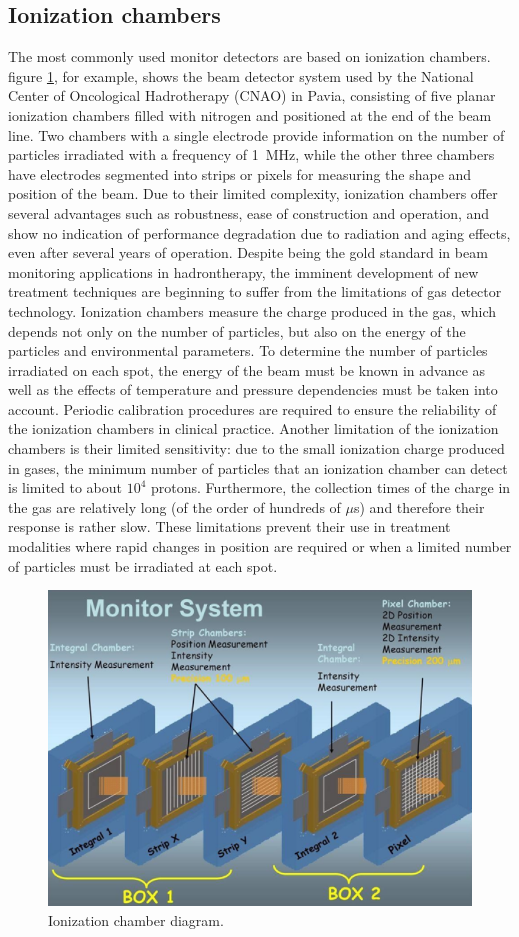 \subsection{Ionization chambers}
The most commonly used monitor detectors are based on ionization chambers.
figure \ref{fig:monitor}, for example, shows the beam detector system used by the National Center of Oncological Hadrotherapy (CNAO) in Pavia, consisting of five planar ionization chambers filled with nitrogen and positioned at the end of the beam line.
Two chambers with a single electrode provide information on the number of particles irradiated with a frequency of 1~MHz, while the other three chambers have electrodes segmented into strips or pixels for measuring the shape and position of the beam.
\newline
\noindent Due to their limited complexity, ionization chambers offer several advantages such as robustness, ease of construction and operation, and show no indication of performance degradation due to radiation and aging effects, even after several years of operation.
Despite being the gold standard in beam monitoring applications in hadrontherapy, the imminent development of new treatment techniques are beginning to suffer from the limitations of gas detector technology.
\newline
Ionization chambers measure the charge produced in the gas, which depends not only on the number of particles, but also on the energy of the particles and environmental parameters.
To determine the number of particles irradiated on each spot, the energy of the beam must be known in advance as well as the effects of temperature and pressure dependencies must be taken into account.
Periodic calibration procedures are required to ensure the reliability of the ionization chambers in clinical practice.
Another limitation of the ionization chambers is their limited sensitivity: due to the small ionization charge produced in gases, the minimum number of particles that an ionization chamber can detect is limited to about $10^4$ protons.
Furthermore, the collection times of the charge in the gas are relatively long (of the order of hundreds of $\mu$s) and therefore their response is rather slow.
These limitations prevent their use in treatment modalities where rapid changes in position are required or when a limited number of particles must be irradiated at each spot.
\begin{figure}[H]
	\centering
	\includegraphics[width=0.7\linewidth]{IMG/ch1/MonitorSystem.PNG}
	\caption{Ionization chamber diagram.}
	\label{fig:monitor}
\end{figure}
